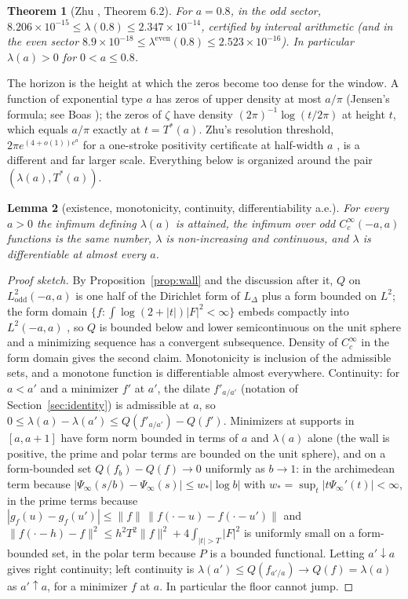 \documentclass[11pt]{article}
\newtheorem{theorem}{Theorem}[section]
\newtheorem{lemma}[theorem]{Lemma}
\theoremstyle{definition}
\theoremstyle{remark}
\newcommand{\Tst}{T^{*}}
\begin{document}
\begin{theorem}[Zhu \cite{zhu}, Theorem 6.2]\label{thm:zhu}
For $a=0.8$, in the odd sector, $8.206\times10^{-15}\le\lambda(0.8)\le 2.347\times10^{-14}$, certified by interval arithmetic (and in the even sector $8.9\times10^{-18}\le\lambda^{\mathrm{even}}(0.8)\le2.523\times10^{-16}$). In particular $\lambda(a)>0$ for $0<a\le0.8$.
\end{theorem}

The horizon is the height at which the zeros become too dense for the window. A function of exponential type $a$ has zeros of upper density at most $a/\pi$ (Jensen's formula; see Boas \cite{boas}); the zeros of $\zeta$ have density $(2\pi)^{-1}\log(t/2\pi)$ at height $t$, which equals $a/\pi$ exactly at $t=\Tst(a)$. Zhu's resolution threshold, $2\pi e^{(4+o(1))e^{a}}$ for a one-stroke positivity certificate at half-width $a$ \cite{zhu}, is a different and far larger scale. Everything below is organized around the pair $(\lambda(a),\Tst(a))$.

\begin{lemma}[existence, monotonicity, continuity, differentiability a.e.]\label{lem:exist}
For every $a>0$ the infimum defining $\lambda(a)$ is attained, the infimum over odd $C_c^\infty(-a,a)$ functions is the same number, $\lambda$ is non-increasing and continuous, and $\lambda$ is differentiable at almost every $a$.
\end{lemma}
\begin{proof}[Proof sketch]
By Proposition~\ref{prop:wall} and the discussion after it, $Q$ on $L^2_{\mathrm{odd}}(-a,a)$ is one half of the Dirichlet form of $L_\Delta$ plus a form bounded on $L^2$; the form domain $\{f:\int\log(2+|t|)|F|^2<\infty\}$ embeds compactly into $L^2(-a,a)$ \cite[Thm.\ 2.1 ff.]{chen-weth}, so $Q$ is bounded below and lower semicontinuous on the unit sphere and a minimizing sequence has a convergent subsequence. Density of $C_c^\infty$ in the form domain gives the second claim. Monotonicity is inclusion of the admissible sets, and a monotone function is differentiable almost everywhere. Continuity: for $a<a'$ and a minimizer $f'$ at $a'$, the dilate $f'_{a/a'}$ (notation of Section~\ref{sec:identity}) is admissible at $a$, so $0\le\lambda(a)-\lambda(a')\le Q(f'_{a/a'})-Q(f')$. Minimizers at supports in $[a,a+1]$ have form norm bounded in terms of $a$ and $\lambda(a)$ alone (the wall is positive, the prime and polar terms are bounded on the unit sphere), and on a form-bounded set $Q(f_b)-Q(f)\to0$ uniformly as $b\to1$: in the archimedean term because $|\Psi_\infty(s/b)-\Psi_\infty(s)|\le w_*|\log b|$ with $w_*=\sup_t|t\Psi_\infty'(t)|<\infty$, in the prime terms because $|g_f(u)-g_f(u')|\le\|f\|\,\|f(\cdot-u)-f(\cdot-u')\|$ and $\|f(\cdot-h)-f\|^2\le h^2T^2\|f\|^2+4\int_{|t|>T}|F|^2$ is uniformly small on a form-bounded set, in the polar term because $P$ is a bounded functional. Letting $a'\downarrow a$ gives right continuity; left continuity is $\lambda(a')\le Q(f_{a'/a})\to Q(f)=\lambda(a)$ as $a'\uparrow a$, for a minimizer $f$ at $a$. In particular the floor cannot jump.
\end{proof}
\end{document}
